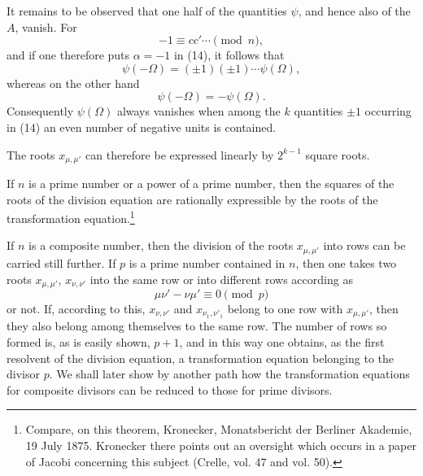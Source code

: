 \documentclass[11pt]{article}
\begin{document}
It remains to be observed that one half of the quantities $\psi$, and hence also of the
$A$, vanish. For
\[
 -1\equiv cc'\cdots\pmod n,
\]
and if one therefore puts $\alpha=-1$ in (14), it follows that
\[
 \psi(-\Omega)=(\pm1)(\pm1)\cdots\psi(\Omega),
\]
whereas on the other hand
\[
 \psi(-\Omega)=-\psi(\Omega).
\]
Consequently $\psi(\Omega)$ always vanishes when among the $k$ quantities $\pm1$ occurring
in (14) an even number of negative units is contained.

The roots $x_{\mu,\mu'}$ can therefore be expressed linearly by $2^{k-1}$ square roots.

If $n$ is a prime number or a power of a prime number, then the squares of the roots of the
division equation are rationally expressible by the roots of the transformation equation.\footnote{Compare, on this theorem, Kronecker, Monatsbericht der Berliner Akademie, 19 July 1875. Kronecker there points out an oversight which occurs in a paper of Jacobi concerning this subject (Crelle, vol. 47 and vol. 50).}

If $n$ is a composite number, then the division of the roots $x_{\mu,\mu'}$ into rows can be
carried still further. If $p$ is a prime number contained in $n$, then one takes two roots
$x_{\mu,\mu'}$, $x_{\nu,\nu'}$ into the same row or into different rows according as
\[
 \mu\nu'-\nu\mu'\equiv0\pmod p
\]
or not. If, according to this, $x_{\nu,\nu'}$ and $x_{\nu_1,\nu'_1}$ belong to one row with
$x_{\mu,\mu'}$, then they also belong among themselves to the same row. The number of
rows so formed is, as is easily shown, $p+1$, and in this way one obtains, as the first
resolvent of the division equation, a transformation equation belonging to the divisor $p$.
We shall later show by another path how the transformation equations for composite
divisors can be reduced to those for prime divisors.
\end{document}
